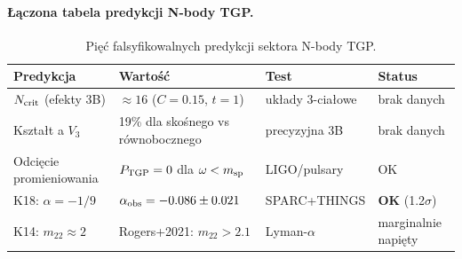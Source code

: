 \paragraph{Łączona tabela predykcji N-body TGP.}
\begin{table}[h]
\centering
\caption{Pięć falsyfikowalnych predykcji sektora N-body TGP.}
\label{tab:nbody-all}
\begin{tabular}{llll}
\toprule
Predykcja & Wartość & Test & Status \\
\midrule
$N_{\rm crit}$ (efekty 3B) & $\approx 16$ ($C=0.15$, $t=1$) & układy 3-ciałowe & brak danych \\
Kształt a $V_3$ & 19\% dla skośnego vs równobocznego & precyzyjna 3B & brak danych \\
Odcięcie promieniowania & $P_{\rm TGP}=0$ dla $\omega < m_{\rm sp}$ & LIGO/pulsary & OK \\
K18: $\alpha = -1/9$ & $\alpha_{\rm obs} = -0.086\pm0.021$ & SPARC+THINGS & \textbf{OK} (1.2$\sigma$) \\
K14: $m_{22} \approx 2$ & Rogers+2021: $m_{22} > 2.1$ & Lyman-$\alpha$ & marginalnie napięty \\
\bottomrule
\end{tabular}
\end{table}

